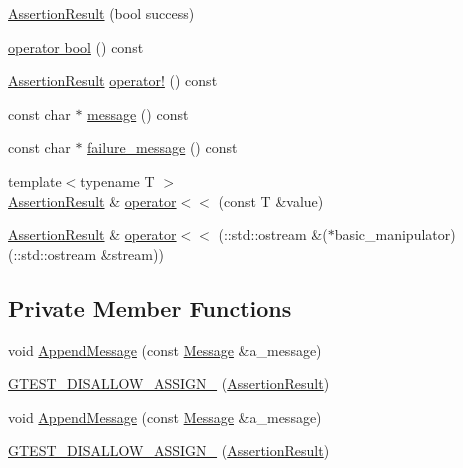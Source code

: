 \begin{DoxyCompactItemize}
\item 
\hyperlink{classtesting_1_1AssertionResult_a0b9b65a26886b23693cbc71bcb242c2f}{\-Assertion\-Result} (bool success)
\item 
\hyperlink{classtesting_1_1AssertionResult_aa385aa18f5e42db5a415c25a90f4193d}{operator bool} () const 
\item 
\hyperlink{classtesting_1_1AssertionResult}{\-Assertion\-Result} \hyperlink{classtesting_1_1AssertionResult_a8569a100f4db8e2861d390326b1b9794}{operator!} () const 
\item 
const char $\ast$ \hyperlink{classtesting_1_1AssertionResult_a9477c5ee8f0751018d646f748d5730b0}{message} () const 
\item 
const char $\ast$ \hyperlink{classtesting_1_1AssertionResult_abcd7608307338bfa5ce51e045ba09833}{failure\-\_\-message} () const 
\item 
{\footnotesize template$<$typename T $>$ }\\\hyperlink{classtesting_1_1AssertionResult}{\-Assertion\-Result} \& \hyperlink{classtesting_1_1AssertionResult_aba40d0b5bf8bfa326fc5c841f292aca4}{operator$<$$<$} (const \-T \&value)
\item 
\hyperlink{classtesting_1_1AssertionResult}{\-Assertion\-Result} \& \hyperlink{classtesting_1_1AssertionResult_a5363ebd66dbf2d1f2226032c470def13}{operator$<$$<$} (\-::std\-::ostream \&($\ast$basic\-\_\-manipulator)(\-::std\-::ostream \&stream))
\end{DoxyCompactItemize}
\subsection*{\-Private \-Member \-Functions}
\begin{DoxyCompactItemize}
\item 
void \hyperlink{classtesting_1_1AssertionResult_af5a0f627b22e44c51dbfd428ade27d76}{\-Append\-Message} (const \hyperlink{classtesting_1_1Message}{\-Message} \&a\-\_\-message)
\item 
\hyperlink{classtesting_1_1AssertionResult_ac530119bcd23860c788cef6dadba5568}{\-G\-T\-E\-S\-T\-\_\-\-D\-I\-S\-A\-L\-L\-O\-W\-\_\-\-A\-S\-S\-I\-G\-N\-\_\-} (\hyperlink{classtesting_1_1AssertionResult}{\-Assertion\-Result})
\item 
void \hyperlink{classtesting_1_1AssertionResult_af5a0f627b22e44c51dbfd428ade27d76}{\-Append\-Message} (const \hyperlink{classtesting_1_1Message}{\-Message} \&a\-\_\-message)
\item 
\hyperlink{classtesting_1_1AssertionResult_ac530119bcd23860c788cef6dadba5568}{\-G\-T\-E\-S\-T\-\_\-\-D\-I\-S\-A\-L\-L\-O\-W\-\_\-\-A\-S\-S\-I\-G\-N\-\_\-} (\hyperlink{classtesting_1_1AssertionResult}{\-Assertion\-Result})
\end{DoxyCompactItemize}
